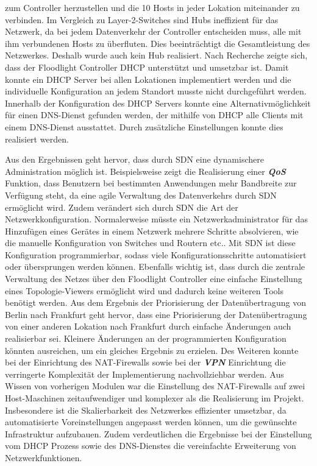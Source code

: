 \documentclass[fontsize=12pt,paper=a4,open=any,parskip=half,
  twoside=false,toc=listof,toc=bibliography,fleqn,leqno,
  captions=nooneline,captions=tableabove,british]{scrbook}
\begin{document}
{zum Controller herzustellen und die 10 Hosts in jeder Lokation miteinander zu verbinden. Im Vergleich zu Layer-2-Switches sind Hubs ineffizient für das Netzwerk, da bei jedem Datenverkehr der Controller entscheiden muss, alle mit ihm verbundenen Hosts zu überfluten. Dies beeinträchtigt die Gesamtleistung des Netzwerkes. Deshalb wurde auch kein Hub realisiert. Nach Recherche zeigte sich, dass der Floodlight Controller DHCP unterstützt und umsetzbar ist. Damit konnte ein DHCP Server bei allen Lokationen implementiert werden und die individuelle Konfiguration an jedem Standort musste nicht durchgeführt werden. Innerhalb der Konfiguration des DHCP Servers konnte eine Alternativmöglichkeit für einen DNS-Dienst gefunden werden, der mithilfe von DHCP alle Clients mit einem DNS-Dienst ausstattet. Durch zusätzliche Einstellungen konnte dies realisiert werden. \par 

Aus den Ergebnissen geht hervor, dass durch SDN eine dynamischere Administration möglich ist. Beispielsweise zeigt die Realisierung einer \textit{\textbf{QoS}} Funktion, dass Benutzern bei bestimmten Anwendungen mehr Bandbreite zur Verfügung steht, da eine agile Verwaltung des Datenverkehrs durch SDN ermöglicht wird. Zudem verändert sich durch SDN die Art der Netzwerkkonfiguration. Normalerweise müsste ein Netzwerkadministrator für das Hinzufügen eines Gerätes in einem Netzwerk mehrere Schritte absolvieren, wie die manuelle Konfiguration von Switches und Routern etc.. Mit SDN ist diese Konfiguration programmierbar, sodass viele Konfigurationsschritte automatisiert oder übersprungen werden können. Ebenfalls wichtig ist, dass durch die zentrale Verwaltung des Netzes über den Floodlight Controller eine einfache Einstellung eines Topologie-Viewers ermöglicht wird und dadurch keine weiteren Tools benötigt werden. Aus dem Ergebnis der Priorisierung der Datenübertragung von Berlin nach Frankfurt geht hervor, dass eine Priorisierung der Datenübertragung von einer anderen Lokation nach Frankfurt durch einfache Änderungen auch realisierbar sei. Kleinere Änderungen an der programmierten Konfiguration könnten ausreichen, um ein gleiches Ergebnis zu erzielen. Des Weiteren konnte bei der Einrichtung des NAT-Firewalls sowie bei der \textit{\textbf{VPN}} Einrichtung die verringerte Komplexität der Implementierung nachvollziehbar werden. Aus Wissen von vorherigen Modulen war die Einstellung des NAT-Firewalls auf zwei Host-Maschinen zeitaufwendiger und komplexer als die Realisierung im Projekt. Insbesondere ist die Skalierbarkeit des Netzwerkes effizienter umsetzbar, da automatisierte Voreinstellungen angepasst werden können, um die gewünschte Infrastruktur aufzubauen. Zudem verdeutlichen die Ergebnisse bei der Einstellung vom DHCP Prozess sowie des DNS-Dienstes die vereinfachte Erweiterung von Netzwerkfunktionen.  

}
\end{document}
